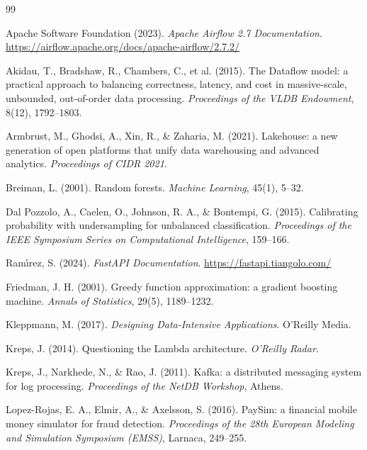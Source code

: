 \documentclass[11pt,a4paper]{article}
\begin{document}
\begin{thebibliography}{99}

Apache Software Foundation (2023). \emph{Apache Airflow 2.7 Documentation}.
\url{https://airflow.apache.org/docs/apache-airflow/2.7.2/}

Akidau, T., Bradshaw, R., Chambers, C., et al. (2015). The Dataflow model: a
practical approach to balancing correctness, latency, and cost in massive-scale,
unbounded, out-of-order data processing. \emph{Proceedings of the VLDB
Endowment}, 8(12), 1792--1803.

Armbrust, M., Ghodsi, A., Xin, R., \& Zaharia, M. (2021). Lakehouse: a new
generation of open platforms that unify data warehousing and advanced analytics.
\emph{Proceedings of CIDR 2021}.

Breiman, L. (2001). Random forests. \emph{Machine Learning}, 45(1), 5--32.

Dal Pozzolo, A., Caelen, O., Johnson, R. A., \& Bontempi, G. (2015). Calibrating
probability with undersampling for unbalanced classification. \emph{Proceedings
of the IEEE Symposium Series on Computational Intelligence}, 159--166.

Ram\'{\i}rez, S. (2024). \emph{FastAPI Documentation}.
\url{https://fastapi.tiangolo.com/}

Friedman, J. H. (2001). Greedy function approximation: a gradient boosting
machine. \emph{Annals of Statistics}, 29(5), 1189--1232.

Kleppmann, M. (2017). \emph{Designing Data-Intensive Applications}. O'Reilly Media.

Kreps, J. (2014). Questioning the Lambda architecture. \emph{O'Reilly Radar}.

Kreps, J., Narkhede, N., \& Rao, J. (2011). Kafka: a distributed messaging system
for log processing. \emph{Proceedings of the NetDB Workshop}, Athens.

Lopez-Rojas, E. A., Elmir, A., \& Axelsson, S. (2016). PaySim: a financial mobile
money simulator for fraud detection. \emph{Proceedings of the 28th European
Modeling and Simulation Symposium (EMSS)}, Larnaca, 249--255.


\end{thebibliography}
\end{document}
